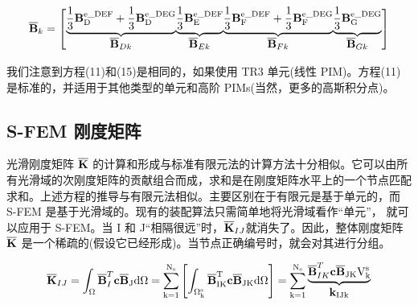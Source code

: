 \documentclass[12pt,a4paper]{article}
\begin{document}
\begin{equation}
\overline{\rm\textbf{B}}_k=\left[
\begin{matrix} \underbrace{ \frac{1}{3}\rm\textbf{B}^{e\_{DEF}}_D + \frac{1}{3}\rm\textbf{B}^{e\_{DEG}}_D} \\ {\overline{\rm\textbf{B}}_{Dk}}\end{matrix}
\begin{matrix} \underbrace{\frac{1}{3}\rm\textbf{B}^{e\_{DEF}}_E} \\ {\overline{\rm\textbf{B}}_{Ek}}\end{matrix}
\begin{matrix} \underbrace{ \frac{1}{3}\rm\textbf{B}^{e\_{DEF}}_F + \frac{1}{3}\rm\textbf{B}^{e\_{DEG}}_F}\\{\overline{\rm\textbf{B}}_{Fk}}\end{matrix}
\begin{matrix} \underbrace{\frac{1}{3}\rm\textbf{B}^{e\_{DEG}}_G} \\ {\overline{\rm\textbf{B}}_{Gk}}\end{matrix}
\right]
\end{equation}

我们注意到方程(11)和(15)是相同的，如果使用 TR3 单元(线性 PIM)。方程(11)是标准的，并适用于其他类型的单元和高阶 PIMs(当然，更多的高斯积分点)。

\subsection{S-FEM 刚度矩阵}
光滑刚度矩阵 $\overline{\rm\textbf{K}}$ 的计算和形成与标准有限元法的计算方法十分相似。它可以由所有光滑域的次刚度矩阵的贡献组合而成，求和是在刚度矩阵水平上的一个节点匹配求和。上述方程的推导与有限元法相似。主要区别在于有限元是基于单元的，而 S-FEM 是基于光滑域的。现有的装配算法只需简单地将光滑域看作“单元”，
就可以应用于 S-FEM。当 I 和 J“相隔很远”时，$\overline{\rm\textbf{K}}_{IJ}$就消失了。因此，整体刚度矩阵 $\overline{\rm\textbf{K}}$ 是一个稀疏的(假设它已经形成)。当节点正确编号时，就会对其进行分组。

\begin{equation}
\overline{\rm\textbf{K}}_{IJ}=\int_{\Omega}^{}\overline{\rm\textbf{B}}^T_I \rm\textbf{c}\overline{\rm\textbf{B}}_J d \Omega =
\sum_{k=1}^{N_s}\left[\int_{\Omega ^s_k}^{}\overline{\rm\textbf{B}}^T_{IK}\rm\textbf{c}\overline{\rm\textbf{B}}_{JK}d\Omega \right]=
\sum_{k=1}^{N_s}\begin{matrix} \underbrace{\overline{\rm\textbf{B}}^T_{IK}\rm\textbf{c}\overline{\rm\textbf{B}}_{JK}V^s_k} \\ \rm\textbf{k}_{IJk}\end{matrix}
\end{equation}
\end{document}
